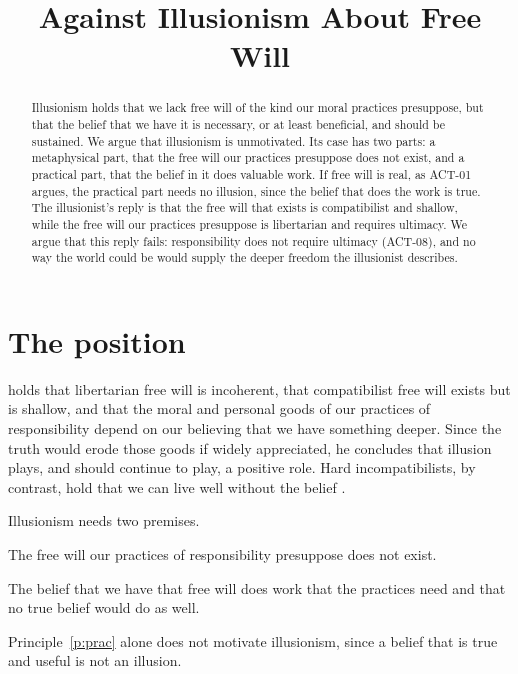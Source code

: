 \documentclass{situationist-preprint}
\title{Against Illusionism About Free Will}
\begin{document}
\maketitle

\begin{abstract}
Illusionism holds that we lack free will of the kind our moral practices presuppose, but that the belief that we have it is necessary, or at least beneficial, and should be sustained. We argue that illusionism is unmotivated. Its case has two parts: a metaphysical part, that the free will our practices presuppose does not exist, and a practical part, that the belief in it does valuable work. If free will is real, as ACT-01 argues, the practical part needs no illusion, since the belief that does the work is true. The illusionist's reply is that the free will that exists is compatibilist and shallow, while the free will our practices presuppose is libertarian and requires ultimacy. We argue that this reply fails: responsibility does not require ultimacy (ACT-08), and no way the world could be would supply the deeper freedom the illusionist describes.
\end{abstract}

\section{The position}

\citet{Smilansky2000} holds that libertarian free will is incoherent, that compatibilist free will exists but is shallow, and that the moral and personal goods of our practices of responsibility depend on our believing that we have something deeper. Since the truth would erode those goods if widely appreciated, he concludes that illusion plays, and should continue to play, a positive role. Hard incompatibilists, by contrast, hold that we can live well without the belief \citep{Pereboom2001}.

Illusionism needs two premises.

\begin{principle}\label{p:meta}
The free will our practices of responsibility presuppose does not exist.
\end{principle}

\begin{principle}\label{p:prac}
The belief that we have that free will does work that the practices need and that no true belief would do as well.
\end{principle}

Principle~\ref{p:prac} alone does not motivate illusionism, since a belief that is true and useful is not an illusion.
\end{document}
